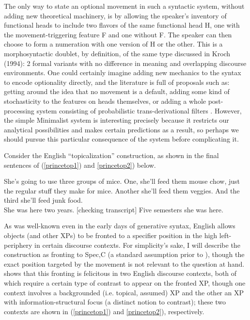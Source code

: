 The only way to state an optional movement in such a syntactic system, without adding new theoretical machinery, is by allowing the speaker's inventory of functional heads to include two flavors of the same functional head H, one with the movement-triggering feature F and one without F. The speaker can then choose to form a numeration with one version of H or the other. This is a morphosyntactic doublet, by definition, of the same type discussed in Kroch (1994): 2 formal variants with no difference in meaning and overlapping discourse environments. One could certainly imagine adding new mechanics to the syntax to encode optionality directly, and the literature is full of proposals such as: getting around the idea that no movement is a default, adding some kind of stochasticity to the features on heads themselves, or adding a whole post-processing system consisting of probabilistic trans-derivational filters . However, the simple Minimalist system is interesting precisely because it restricts our analytical possibilities and makes certain predictions as a result, so perhaps we should pursue this particular consequence of the system before complicating it.

Consider the English ``topicalization'' construction, as shown in the final sentences of (\ref{princetop1}) and \ref{princetop2}) below.

\begin{exe}
\ex \label{princetop1} She's going to use three groups of mice. One, she'll feed them mouse chow, just the regular stuff they make for
mice. Another she'll feed them veggies. And the third she'll feed junk food.\\

\ex \label{princetop2} She was here two years. [checking transcript] Five semesters she was here.\\
\citep[][8,9]{prince1999}

\end{exe}

\noindent As was well-known even in the early days of generative syntax, English allows objects (and other XPs) to be fronted to a specifier position in the high left-periphery in certain discourse contexts. For simplicity's sake, I will describe the construction as fronting to Spec,C (a standard assumption prior to \citealt{rizzi1997}), though the exact position targeted by the movement is not relevant to the question at hand. \citet{prince1985,prince1998, prince1999} shows that this fronting is felicitous in two English discourse contexts, both of which require a certain type of contrast to appear on the fronted XP, though one context involves a backgrounded (i.e. topical, assumed) XP and the other an XP with information-structural focus (a distinct notion to contrast); these two contexts are shown in (\ref{princetop1}) and \ref{princetop2}), respectively.

